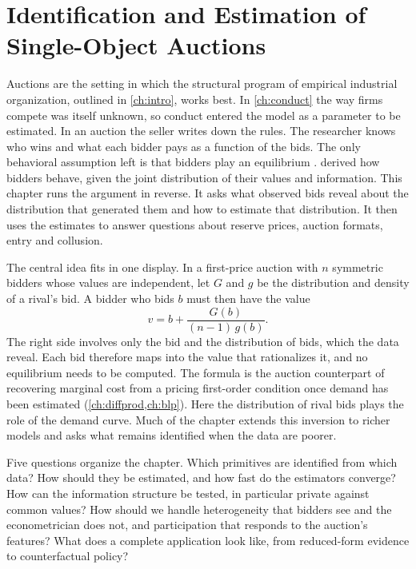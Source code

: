 
\chapter{Identification and Estimation of Single-Object Auctions}\label{ch:auction-empirics}

Auctions are the setting in which the structural program of empirical industrial organization, outlined in
\cref{ch:intro}, works best. In
\cref{ch:conduct} the way firms compete was itself unknown, so conduct entered the model as a parameter to be
estimated. In an auction the seller writes down the rules. The researcher knows who wins and what each bidder
pays as a function of the bids. The only behavioral assumption left is that bidders play an equilibrium
\citep[Section~1]{AtheyHaile2007}.  derived how bidders behave, given the joint
distribution of their values and information. This chapter runs the argument in reverse. It asks what observed
bids reveal about the distribution that generated them and how to estimate that distribution. It then uses
the estimates to answer questions about reserve prices, auction formats, entry and collusion.

The central idea fits in one display. In a first-price auction with $n$ symmetric bidders whose values are
independent, let $G$ and $g$ be the distribution and density of a rival's bid. A bidder who bids $b$ must then
have the value
\[
v=b+\frac{G(b)}{(n-1)\,g(b)} .
\]
The right side involves only the bid and the distribution of bids, which the data reveal. Each bid therefore
maps into the value that rationalizes it, and no equilibrium needs to be computed. The formula is the auction
counterpart of recovering marginal cost from a pricing first-order condition once demand has been estimated
(\cref{ch:diffprod,ch:blp}). Here the distribution of rival bids plays the role of the demand curve. Much of the
chapter extends this inversion to richer models and asks what remains identified when the data are poorer.

Five questions organize the chapter. Which primitives are identified from which data? How should they be
estimated, and how fast do the estimators converge? How can the information structure be tested, in particular
private against common values? How should we handle heterogeneity that bidders see and the econometrician does
not, and participation that responds to the auction's features? What does a complete application look like,
from reduced-form evidence to counterfactual policy?

